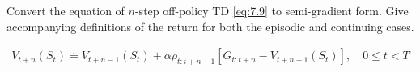 
\begin{exercise}[Exercise 11.1]

Convert the equation of $n$-step off-policy TD \eqref{eq:7.9} to semi-gradient form.
Give accompanying definitions of the return for both the episodic and continuing cases.

\end{exercise}


\begin{solution}

\begin{align} \label{eq:7.9} \tag{7.9}
    V_{t+n}(S_t)
    \doteq
    V_{t+n-1}(S_t)
    +
    \alpha \rho_{t:t+n-1} [G_{t:t+n} - V_{t+n-1}(S_t)],
    \quad
    0 \leq t < T
\end{align}

\end{solution}

